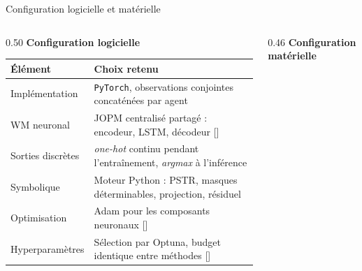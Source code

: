 \documentclass[aspectratio=169]{beamer}
\newcommand{\scite}[1]{{\normalfont\color{SpaceCyan!60!black}[\citealp{#1}]}}
\begin{document}
\begin{frame}{Configuration logicielle et matérielle}
  \tiny
  \begin{columns}[T,totalwidth=\textwidth]
    \begin{column}{0.50\textwidth}
      \scriptsize\textbf{Configuration logicielle}

      \vspace{0.08cm}
      \tiny
      \renewcommand{\arraystretch}{1.08}
      \begin{tabularx}{\linewidth}{p{2.2cm}X}
        \toprule
        \textbf{Élément} & \textbf{Choix retenu}                                                                 \\
        \midrule
        Implémentation
                         & \texttt{PyTorch}, observations conjointes concaténées par agent                       \\
        WM neuronal
                         & JOPM centralisé partagé : encodeur, LSTM, décodeur \scite{hochreiter1997long}         \\
        Sorties discrètes
                         & \emph{one-hot} continu pendant l'entraînement, \emph{argmax} à l'inférence            \\
        Symbolique
                         & Moteur Python : PSTR, masques déterminables, projection, résiduel                     \\
        Optimisation
                         & Adam pour les composants neuronaux \scite{kingma2017adammethodstochasticoptimization} \\
        Hyperparamètres
                         & Sélection par Optuna, budget identique entre méthodes \scite{akiba2019optuna}         \\
        \bottomrule
      \end{tabularx}
    \end{column}

    \begin{column}{0.46\textwidth}
      \scriptsize\textbf{Configuration matérielle}


\end{column}
\end{columns}
\end{frame}
\end{document}
